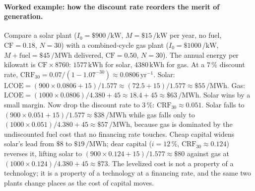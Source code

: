 \paragraph{Worked example: how the discount rate reorders the merit of
generation.} Compare a solar plant ($I_0 = \$900\,\si{\per\kilo\watt}$,
$M = \$15\,\si{\per\kilo\watt}$ per year, no fuel, $\text{CF} = 0.18$,
$N = 30$) with a combined-cycle gas plant ($I_0 = \$1000\,\si{\per\kilo\watt}$,
$M + \text{fuel} = \$45\,\si{\per\mega\watt\hour}$ delivered, $\text{CF} =
0.50$, $N = 30$). The annual energy per kilowatt is $\text{CF}\times 8760$:
$1577\,\si{\kilo\watt\hour}$ for solar, $4380\,\si{\kilo\watt\hour}$ for gas.
At a $7\,\%$ discount rate, $\text{CRF}_{30} = 0.07/(1 - 1.07^{-30}) \approx
0.0806\,\text{yr}^{-1}$. Solar: $\text{LCOE} = (900\times 0.0806 +
15)/1.577 \approx (72.5 + 15)/1.577 \approx \$55\,\si{\per\mega\watt\hour}$.
Gas: $\text{LCOE} = (1000\times 0.0806)/4.380 + 45 \approx 18.4 + 45 \approx
\$63\,\si{\per\mega\watt\hour}$. Solar wins by a small margin. Now drop the
discount rate to $3\,\%$: $\text{CRF}_{30} \approx 0.051$. Solar falls to
$(900\times 0.051 + 15)/1.577 \approx \$38\,\si{\per\mega\watt\hour}$ while
gas falls only to $(1000\times 0.051)/4.380 + 45 \approx \$57\,\si{\per\mega
\watt\hour}$, because gas is dominated by the undiscounted fuel cost that no
financing rate touches. Cheap capital widens solar's lead from $\$8$ to $\$19
\,\si{\per\mega\watt\hour}$; dear capital ($i = 12\,\%$, $\text{CRF}_{30}
\approx 0.124$) reverses it, lifting solar to $(900\times 0.124 + 15)/1.577
\approx \$80$ against gas at $(1000\times 0.124)/4.380 + 45 \approx \$73$. The
levelized cost is not a property of a technology; it is a property of a
technology at a financing rate, and the same two plants change places as the
cost of capital moves.

